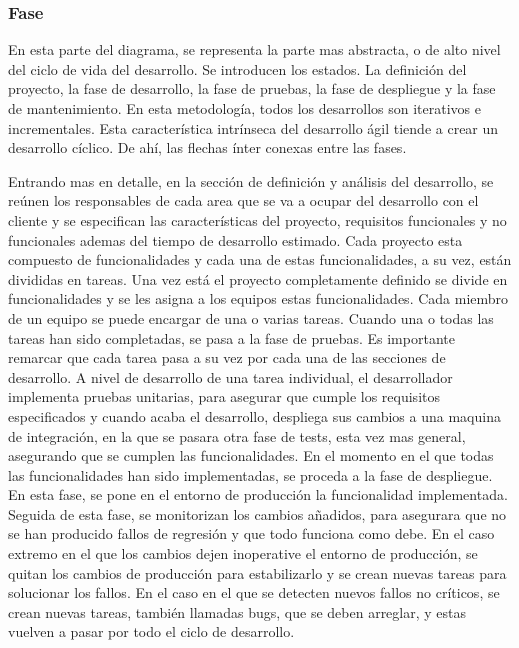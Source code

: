 \documentclass[12pt]{report} %
\begin{document}
\subsubsection{Fase} 

En esta parte del diagrama, se representa la parte mas abstracta, o de alto
nivel del ciclo de vida del desarrollo.  Se introducen los estados.  La
definición del proyecto, la fase de desarrollo, la fase de pruebas, la fase de
despliegue y la fase de mantenimiento.  En esta metodología, todos los
desarrollos son iterativos e incrementales.  Esta característica intrínseca del
desarrollo ágil tiende a crear un desarrollo cíclico.  De ahí, las flechas ínter
conexas entre las fases.

Entrando mas en detalle, en la sección de definición y análisis del desarrollo,
se reúnen los responsables de cada area que se va a ocupar del desarrollo con el
cliente y se especifican las características del proyecto, requisitos
funcionales y no funcionales ademas del tiempo de desarrollo estimado.  Cada
proyecto esta compuesto de funcionalidades y cada una de estas funcionalidades,
a su vez, están divididas en tareas.  Una vez está el proyecto completamente
definido se divide en funcionalidades y se les asigna a los equipos estas
funcionalidades.  Cada miembro de un equipo se puede encargar de una o varias
tareas.  Cuando una o todas las tareas han sido completadas, se pasa a la fase
de pruebas.  Es importante remarcar que cada tarea pasa a su vez por cada una de
las secciones de desarrollo.  A nivel de desarrollo de una tarea individual, el
desarrollador implementa pruebas unitarias, para asegurar que cumple los
requisitos especificados y cuando acaba el desarrollo, despliega sus cambios a
una maquina de integración, en la que se pasara otra fase de tests, esta vez mas
general, asegurando que se cumplen las funcionalidades.  En el momento en el que
todas las funcionalidades han sido implementadas, se proceda a la fase de
despliegue.  En esta fase, se pone en el entorno de producción la funcionalidad
implementada.  Seguida de esta fase, se monitorizan los cambios añadidos, para
asegurara que no se han producido fallos de regresión y que todo funciona como
debe.  En el caso extremo en el que los cambios dejen inoperative el entorno de
producción, se quitan los cambios de producción para estabilizarlo y se crean
nuevas tareas para solucionar los fallos.  En el caso en el que se detecten
nuevos fallos no críticos, se crean nuevas tareas, también llamadas bugs, que se
deben arreglar, y estas vuelven a pasar por todo el ciclo de desarrollo.
\end{document}
